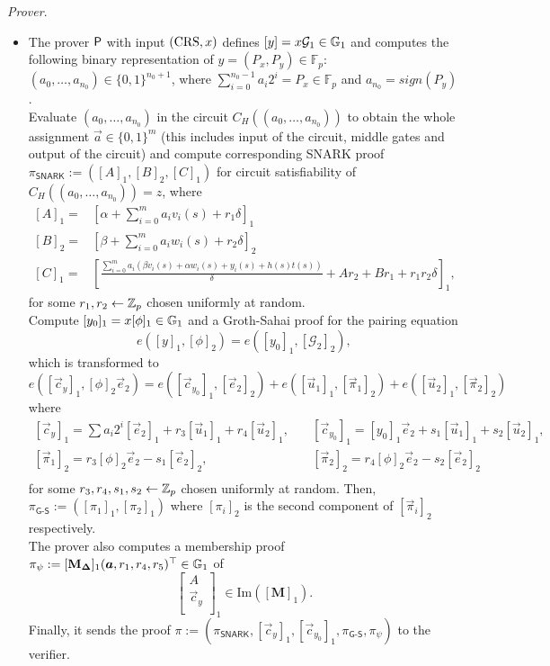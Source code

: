 \noindent \textit{Prover}. 
\begin{itemize}
	\item The prover $\mathsf{P}$ with input $(\textnormal{CRS},x)$ defines $[y]=x\mathcal{G}_1 \in \mathbb{G}_1$ and computes the following binary representation of $y= (P_x, P_y) \in \mathbb{F}_p$:
	$(a_{0},\dots,a_{n_0}) \in \{0,1\}^{n_0+1}$, where $\sum_{i=0}^{n_0-1} a_i 2^i=P_x\in \mathbb{F}_p$ and $a_{n_0} = sign(P_y)$.\\
	Evaluate $(a_{0},\dots,a_{n_0})$ in the circuit $C_H((a_{0},\dots,a_{n_0}))$ to obtain the whole assignment $\vec{a}\in \{0,1\}^m$ (this includes input of the circuit, middle gates and output of the circuit) and compute corresponding SNARK proof $\pi_{\textsf{SNARK}}:=([A]_1,[B]_2,[C]_1)$ for circuit satisfiability of $C_H((a_0,\dots,a_{n_0}))=z$, where
	\[\begin{split}
	[A]_1=&\left[\alpha + \sum_{i=0}^m a_i v_i(s) + r_1 \delta\right]_1\\
	[B]_2 = &\left[\beta + \sum_{i=0}^m a_i w_i(s) + r_2 \delta\right]_2\\
	[C]_1 = &\left[\frac{\sum_{i=0}^m a_i\left(\beta v_i(s)+\alpha w_i(s)+y_i(s)+h(s)t(s)\right)}{\delta}+Ar_2+B r_1+ r_1r_2\delta\right]_1,
	\end{split}\]
	for some $r_1,r_2 \gets \mathbb{Z}_p$ chosen uniformly at random.\\
	Compute $[y_0]_1=x[\phi]_1\in\mathbb{G}_1$ and a Groth-Sahai proof for the pairing equation
	\begin{equation}\label{GS1}
	e([y]_1,[\phi]_2)=e([y_0]_1,[\mathcal{G}_2]_2),
	\end{equation}
	which is transformed to
	\begin{equation}\label{GS2}
	e([\vec{c}_y]_1,[\phi]_2\vec{e}_2)= e([\vec{c}_{y_0}]_1,[\vec{e}_2]_2)+e([\vec{u}_1]_1,[\vec{\pi}_1]_2)+e([\vec{u}_2]_1,[\vec{\pi}_2]_2)
	\end{equation}
	where 
	$$\begin{array}{ll}	
	\left[\vec{c}_y\right]_1=\sum a_i 2^i [\vec{e}_2]_1+r_3[\vec{u}_1]_1 + r_4[\vec{u}_2]_1,\quad &[\vec{c}_{y_0}]_1 = [y_0]_1\vec{e}_2 + s_1[\vec{u}_1]_1+s_2[\vec{u}_2]_1,\\
	\left[\vec{\pi}_1\right]_2=r_3[\phi]_2\vec{e}_2-s_1[\vec{e}_2]_2,\quad &
	[\vec{\pi}_2]_2=r_4[\phi]_2\vec{e}_2-s_2[\vec{e}_2]_2\\	
	\end{array}$$
	for some $r_3,r_4,s_1,s_2\gets \mathbb{Z}_p$ chosen uniformly at random. Then,
	$\pi_{\textsf{G-S}}:=([\pi_1]_1,[\pi_2]_1)$ where $[\pi_i]_2$ is the second component of $[\vec{\pi}_i]_2$ respectively.\\
	The prover also computes a membership proof $\pi_{\psi}:=[\mathbf{M}_{\mathbf{\Delta}}]_1(\vec{a},r_1,r_4,r_5)^{\top}\in \G_1$ of 
	$$\left[\begin{array}{c}
	A\\
	\vec{c}_y\\
	\end{array}\right]_1 \in \text{Im}\left(\left[\mathbf{M}\right]_1\right).$$	
	Finally, it sends the proof $\pi:= \left(\pi_{\textsf{SNARK}},[\vec{c}_y]_1,[\vec{c}_{y_0}]_1, \pi_{\textsf{G-S}},\pi_\psi\right)$ to the verifier.
\end{itemize}

